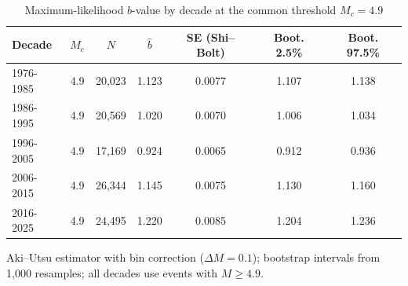 \begin{table}[t]
\centering
\begin{threeparttable}
\caption{Maximum-likelihood $b$-value by decade at the common threshold $M_c=4.9$}
\label{tab:bvalues_common}
\begin{tabular}{lcccccc}
\toprule
Decade & $M_c$ & $N$ & $\hat b$ & SE (Shi--Bolt) & Boot. 2.5\% & Boot. 97.5\% \\
\midrule
1976-1985 & 4.9 & 20,023 & 1.123 & 0.0077 & 1.107 & 1.138 \\
1986-1995 & 4.9 & 20,569 & 1.020 & 0.0070 & 1.006 & 1.034 \\
1996-2005 & 4.9 & 17,169 & 0.924 & 0.0065 & 0.912 & 0.936 \\
2006-2015 & 4.9 & 26,344 & 1.145 & 0.0075 & 1.130 & 1.160 \\
2016-2025 & 4.9 & 24,495 & 1.220 & 0.0085 & 1.204 & 1.236 \\
\bottomrule
\end{tabular}
\begin{tablenotes}[flushleft]
\footnotesize
\item Aki--Utsu estimator with bin correction ($\Delta M=0.1$); bootstrap intervals from 1,000 resamples; all decades use events with $M\geq 4.9$.
\end{tablenotes}
\end{threeparttable}
\end{table}
